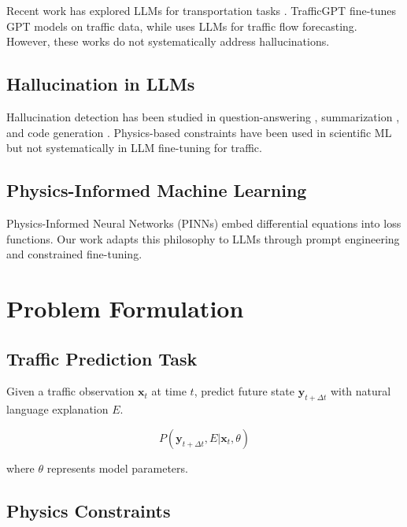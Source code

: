\documentclass[conference]{IEEEtran}
\begin{document}
Recent work has explored LLMs for transportation tasks \cite{yuan2024survey}. TrafficGPT \cite{zhou2023trafficgpt} fine-tunes GPT models on traffic data, while \cite{li2024llm} uses LLMs for traffic flow forecasting. However, these works do not systematically address hallucinations.

\subsection{Hallucination in LLMs}

Hallucination detection has been studied in question-answering \cite{manakul2023selfcheckgpt}, summarization \cite{maynez2020faithfulness}, and code generation \cite{chen2021evaluating}. Physics-based constraints have been used in scientific ML \cite{karniadakis2021physics} but not systematically in LLM fine-tuning for traffic.

\subsection{Physics-Informed Machine Learning}

Physics-Informed Neural Networks (PINNs) \cite{raissi2019physics} embed differential equations into loss functions. Our work adapts this philosophy to LLMs through prompt engineering and constrained fine-tuning.

\section{Problem Formulation}

\subsection{Traffic Prediction Task}

Given a traffic observation $\mathbf{x}_t$ at time $t$, predict future state $\mathbf{y}_{t+\Delta t}$ with natural language explanation $E$.

\begin{equation}
    P(\mathbf{y}_{t+\Delta t}, E | \mathbf{x}_t, \theta)
\end{equation}

where $\theta$ represents model parameters.

\subsection{Physics Constraints}
\end{document}
